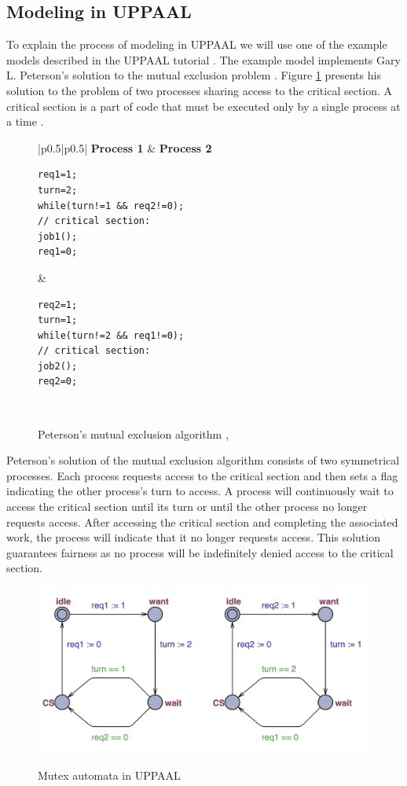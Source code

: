\subsection{Modeling in UPPAAL}
To explain the process of modeling in UPPAAL we will use one of the example models described in the UPPAAL tutorial \cite{SmallTutorial2009}. The example model implements Gary L. Peterson's solution to the mutual exclusion problem \cite{Peterson1981}. Figure \ref{fig:mutex_code} presents his solution to the problem of two processes sharing access to the critical section. A critical section is a part of code that must be executed only by a single process at a time \cite{Raynal2012}.

\begin{figure}[H]
\caption{Peterson’s mutual exclusion algorithm 
\label{fig:mutex_code}
\cite{SmallTutorial2009}, \cite{Peterson1981}}
\begin{tabular}{|p{}|p{}|}
\hline
\textbf{Process 1} & \textbf{Process 2} \\
\hline
\begin{lstlisting}[basicstyle=\ttfamily]
req1=1;
turn=2;
while(turn!=1 && req2!=0);
// critical section:
job1();
req1=0;
\end{lstlisting}
&
\begin{lstlisting}[basicstyle=\ttfamily]
req2=1;
turn=1;
while(turn!=2 && req1!=0);
// critical section:
job2();
req2=0;
\end{lstlisting}
\\
\hline
\end{tabular}
\end{figure}

\noindent
Peterson's solution of the mutual exclusion algorithm consists of two symmetrical processes. Each process requests access to the critical section and then sets a flag indicating the other process's turn to access. A process will continuously wait to access the critical section until its turn or until the other process no longer requests access. After accessing the critical section and completing the associated work, the process will indicate that it no longer requests access. This solution guarantees fairness as no process will be indefinitely denied access to the critical section.


\begin{figure}[H]
\caption{Mutex automata in UPPAAL \cite{SmallTutorial2009}}
\includegraphics[width=\textwidth]{images/mutex.png}
\label{fig:mutex_uppaal}
\end{figure}

